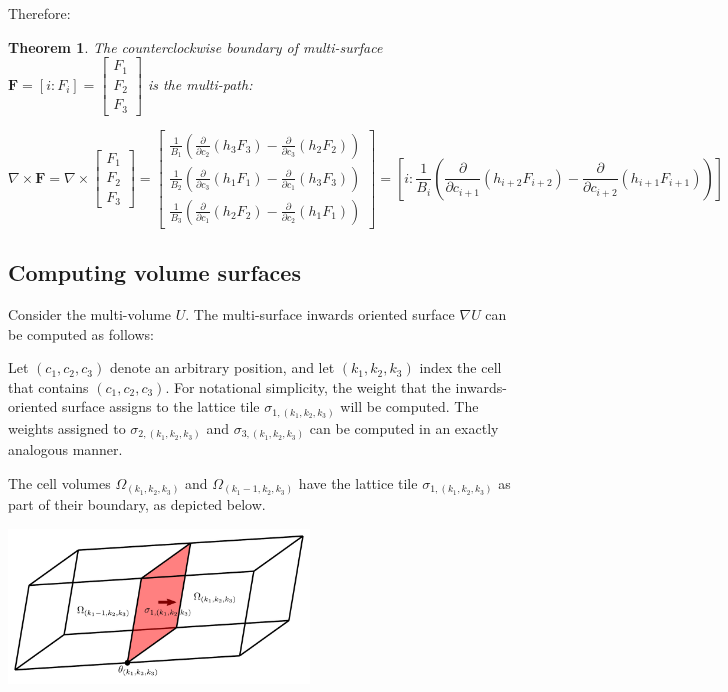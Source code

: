 \documentclass{book}
\newtheorem{thm}{Theorem}
\begin{document}
Therefore:
\begin{thm}
The counterclockwise boundary of multi-surface \(\mathbf{F} = [i : F_i] = \begin{bmatrix} F_1 \\ F_2 \\ F_3 \end{bmatrix}\) is the multi-path:

\[\nabla \times \mathbf{F} = \nabla \times \begin{bmatrix} F_1 \\ F_2 \\ F_3 \end{bmatrix} = \begin{bmatrix} \frac{1}{B_1}\left(\frac{\partial}{\partial c_2}(h_3 F_3) - \frac{\partial}{\partial c_3}(h_2 F_2)\right) \\ \frac{1}{B_2}\left(\frac{\partial}{\partial c_3}(h_1 F_1) - \frac{\partial}{\partial c_1}(h_3 F_3)\right) \\ \frac{1}{B_3}\left(\frac{\partial}{\partial c_1}(h_2 F_2) - \frac{\partial}{\partial c_2}(h_1 F_1)\right) \end{bmatrix} = \left[ i : \frac{1}{B_i}\left(\frac{\partial}{\partial c_{i+1}}(h_{i+2} F_{i+2}) - \frac{\partial}{\partial c_{i+2}}(h_{i+1} F_{i+1})\right) \right]\]
\end{thm}




\subsection*{Computing volume surfaces}

Consider the multi-volume \(U\). The multi-surface inwards oriented surface \(\nabla U\) can be computed as follows:

Let \((c_1, c_2, c_3)\) denote an arbitrary position, and let \((k_1, k_2, k_3)\) index the cell that contains \((c_1, c_2, c_3)\). For notational simplicity, the weight that the inwards-oriented surface assigns to the lattice tile \(\sigma_{1, (k_1, k_2, k_3)}\) will be computed. The weights assigned to \(\sigma_{2, (k_1, k_2, k_3)}\) and \(\sigma_{3, (k_1, k_2, k_3)}\) can be computed in an exactly analogous manner. 

The cell volumes \(\Omega_{(k_1, k_2, k_3)}\) and \(\Omega_{(k_1-1,k_2,k_3)}\) have the lattice tile \(\sigma_{1,(k_1,k_2,k_3)}\) as part of their boundary, as depicted below. 

\begin{center}
\includegraphics[width = 0.6\textwidth]{Coordinate_systems/volume_surface_cell}
\end{center}
\end{document}
